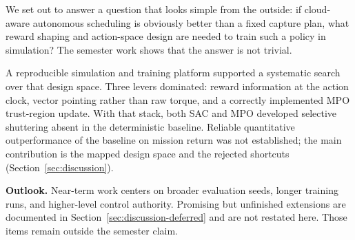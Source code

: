 \label{sec:conclusion}

We set out to answer a question that looks simple from the outside:
if cloud-aware autonomous scheduling is obviously better than a fixed capture plan, what reward shaping and action-space design are needed to train such a policy in simulation?
The semester work shows that the answer is not trivial.

A reproducible simulation and training platform supported a systematic search over that design space.
Three levers dominated: reward information at the action clock, vector pointing rather than raw torque, and a correctly implemented MPO trust-region update.
With that stack, both SAC and MPO developed selective shuttering absent in the deterministic baseline.
Reliable quantitative outperformance of the baseline on mission return was not established; the main contribution is the mapped design space and the rejected shortcuts (Section~\ref{sec:discussion}).

\textbf{Outlook.}
Near-term work centers on broader evaluation seeds, longer training runs, and higher-level control authority.
Promising but unfinished extensions are documented in Section~\ref{sec:discussion-deferred} and are not restated here.
Those items remain outside the semester claim.
